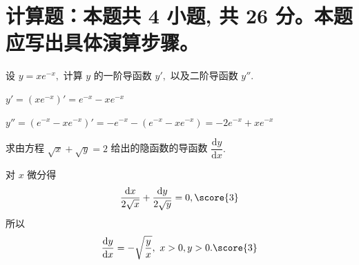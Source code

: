 \section{计算题：本题共 4 小题, 共 26 分。本题应写出具体演算步骤。}






\begin{question}[points = 8]
设 $y = xe^{-x},$ 计算 $y$ 的一阶导函数 $y',$ 以及二阶导函数 $y''.$

\end{question}

\begin{solution}
$y' = (xe^{-x})' = e^{-x} - xe^{-x}$ 

$y'' = (e^{-x} - xe^{-x})' = -e^{-x} - (e^{-x} - xe^{-x}) = -2e^{-x} + xe^{-x}$ 
\end{solution}


\begin{question}[points = 6]
求由方程 $\sqrt{x} + \sqrt{y} = 2$ 给出的隐函数的导函数 $\displaystyle \dfrac{\mathrm{d}y}{\mathrm{d}x}.$

\end{question}

\begin{solution}
对 $x$ 微分得
\begin{equation*}
\dfrac{\mathrm{d}x}{2\sqrt{x}} + \dfrac{\mathrm{d}y}{2\sqrt{y}} = 0, \score{3}
\end{equation*}
所以
\begin{equation*}
\dfrac{\mathrm{d}y}{\mathrm{d}x} = -\sqrt{\dfrac{y}{x}}, ~ x > 0, y > 0. \score{3}
\end{equation*}
\end{solution}


